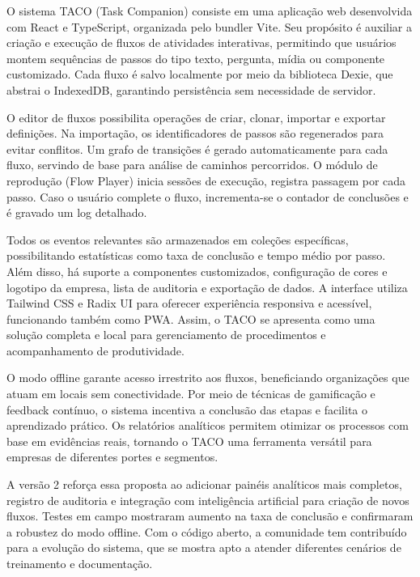O sistema TACO (Task Companion) \cite{taco_repo} consiste em uma aplicação web desenvolvida com React e TypeScript, organizada pelo bundler Vite. Seu propósito é auxiliar a criação e execução de fluxos de atividades interativas, permitindo que usuários montem sequências de passos do tipo texto, pergunta, mídia ou componente customizado. Cada fluxo é salvo localmente por meio da biblioteca Dexie, que abstrai o IndexedDB, garantindo persistência sem necessidade de servidor.

O editor de fluxos possibilita operações de criar, clonar, importar e exportar definições. Na importação, os identificadores de passos são regenerados para evitar conflitos. Um grafo de transições é gerado automaticamente para cada fluxo, servindo de base para análise de caminhos percorridos. O módulo de reprodução (Flow Player) inicia sessões de execução, registra passagem por cada passo. Caso o usuário complete o fluxo, incrementa-se o contador de conclusões e é gravado um log detalhado.

Todos os eventos relevantes são armazenados em coleções específicas, possibilitando estatísticas como taxa de conclusão e tempo médio por passo. Além disso, há suporte a componentes customizados, configuração de cores e logotipo da empresa, lista de auditoria e exportação de dados. A interface utiliza Tailwind CSS e Radix UI para oferecer experiência responsiva e acessível, funcionando também como PWA. Assim, o TACO se apresenta como uma solução completa e local para gerenciamento de procedimentos e acompanhamento de produtividade.

O modo offline garante acesso irrestrito aos fluxos, beneficiando organizações que atuam em locais sem conectividade. Por meio de técnicas de gamificação e feedback contínuo, o sistema incentiva a conclusão das etapas e facilita o aprendizado prático. Os relatórios analíticos permitem otimizar os processos com base em evidências reais, tornando o TACO uma ferramenta versátil para empresas de diferentes portes e segmentos.

A versão 2 reforça essa proposta ao adicionar painéis analíticos mais completos, registro de auditoria e integração com inteligência artificial para criação de novos fluxos. Testes em campo mostraram aumento na taxa de conclusão e confirmaram a robustez do modo offline. Com o código aberto, a comunidade tem contribuído para a evolução do sistema, que se mostra apto a atender diferentes cenários de treinamento e documentação.
